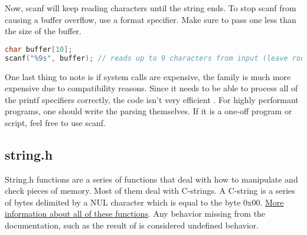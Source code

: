 Now, scanf will keep reading characters until the string ends.
To stop scanf from causing a buffer overflow, use a format specifier.
Make sure to pass one less than the size of the buffer.

\begin{lstlisting}[language=C]
char buffer[10];
scanf("%9s", buffer); // reads up to 9 characters from input (leave room for the 10th byte to be the terminating byte)
\end{lstlisting}

One last thing to note is if system calls are expensive, the  family is much more expensive due to compatibility reasons.
Since it needs to be able to process all of the printf specifiers correctly, the code isn't very efficient .
For highly performant programs, one should write the parsing themselves.
If it is a one-off program or script, feel free to use scanf.

\subsection{string.h}

String.h functions are a series of functions that deal with how to manipulate and check pieces of memory.
Most of them deal with C-strings.
A C-string is a series of bytes delimited by a NUL character which is equal to the byte 0x00.
\href{https://linux.die.net/man/3/string}{More information about all of these functions}.
Any behavior missing from the documentation, such as the result of  is considered undefined behavior.

